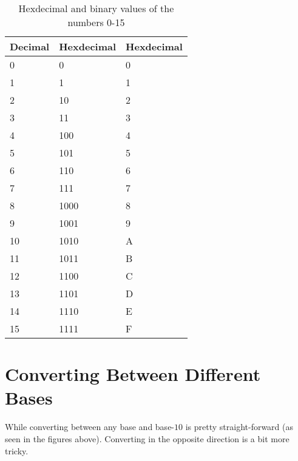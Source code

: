 \begin{table}
    \caption[Hexdecimal and binary values of the numbers 0-15]{Hexdecimal and binary values of the numbers 0-15}
    \label{tab:dec_hex_bin}
	\centering
	\begin{tabular}{ l l l }%
      Decimal & Hexdecimal & Hexdecimal \\
      \hline
	0 & 0 & 0 \\
    1 & 1 & 1 \\
    2 & 10 & 2 \\
    3 & 11 & 3 \\
    4 & 100 & 4 \\
    5 & 101 & 5 \\
    6 & 110 & 6 \\
    7 & 111 & 7 \\
    8 & 1000 & 8 \\
    9 & 1001 & 9 \\
    10 & 1010 & A \\
    11 & 1011 & B \\
    12 & 1100 & C \\
    13 & 1101 & D \\
    14 & 1110 & E \\
    15 & 1111 & F \\
    \hline
    \end{tabular}
\end{table}


\section{Converting Between Different Bases}
While converting between any base and base-$10$ is pretty straight-forward (as seen in the figures above). Converting in the opposite direction is a bit more tricky.
